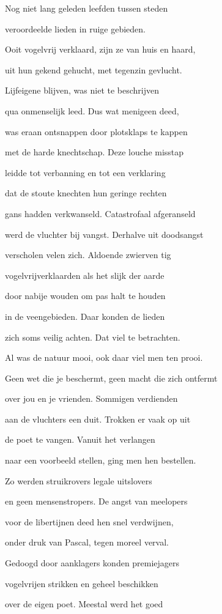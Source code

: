 Nog niet lang geleden
leefden tussen steden

veroordeelde lieden
in ruige gebieden.

Ooit vogelvrij verklaard,
zijn ze van huis en haard,

uit hun gekend gehucht,
met tegenzin gevlucht.

Lijfeigene blijven,
was niet te beschrijven

qua onmenselijk leed.
Dus wat menigeen deed,

was eraan ontsnappen
door plotsklaps te kappen

met de harde knechtschap.
Deze louche misstap

leidde tot verbanning
en tot een verklaring

dat de stoute knechten
hun geringe rechten

gans hadden verkwanseld.
Catastrofaal afgeranseld

werd de vluchter bij vangst.
Derhalve uit doodsangst

verscholen velen zich.
Aldoende zwierven tig

vogelvrijverklaarden
als het slijk der aarde

door nabije wouden
om pas halt te houden

in de veengebieden.
Daar konden de lieden

zich soms veilig achten.
Dat viel te betrachten.

Al was de natuur mooi,
ook daar viel men ten prooi.

Geen wet die je beschermt,
geen macht die zich ontfermt

over jou en je vrienden.
Sommigen verdienden

aan de vluchters een duit.
Trokken er vaak op uit

de poet te vangen.
Vanuit het verlangen

naar een voorbeeld stellen,
ging men hen bestellen.

Zo werden struikrovers
legale uitslovers

en geen mensenstropers.
De angst van meelopers

voor de libertijnen
deed hen snel verdwijnen,

onder druk van Pascal,
tegen moreel verval.

Gedoogd door aanklagers
konden premiejagers

vogelvrijen strikken
en geheel beschikken

over de eigen poet.
Meestal werd het goed


